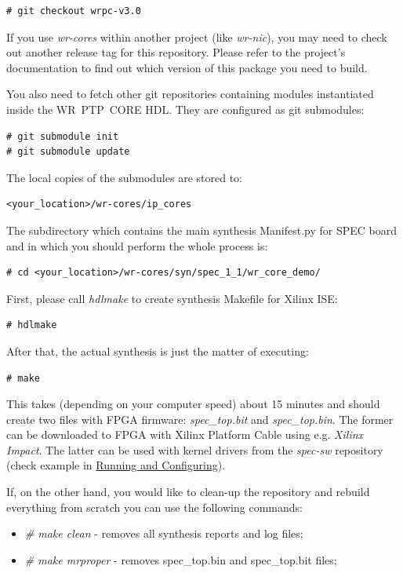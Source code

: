 \documentclass[a4paper, 12pt]{article}
\newcommand{\link}[1]{\hyperref[#1]{#1}}
\newcommand{\codeHook}[1]{\mbox{\ttfamily\MakeTextUppercase{#1}}}
\begin{document}
\begin{lstlisting}
# git checkout wrpc-v3.0
\end{lstlisting}

If you use \textit{wr-cores} within another project (like \textit{wr-nic}), you may need
to check out another release tag for this repository. Please refer to the
project's documentation to find out which version of this package you need to
build.

You also need to fetch other git repositories containing modules instantiated
inside the \codeHook{wr ptp core} HDL. They are configured as git submodules:
\begin{lstlisting}
# git submodule init
# git submodule update
\end{lstlisting}

The local copies of the submodules are stored to:

\begin{lstlisting}
<your_location>/wr-cores/ip_cores
\end{lstlisting}

\vspace{1em}
The subdirectory which contains the main synthesis Manifest.py for \codeHook{spec} board
and in which you should perform the whole process is:

\begin{lstlisting}
# cd <your_location>/wr-cores/syn/spec_1_1/wr_core_demo/
\end{lstlisting}

First, please call \textit{hdlmake} to create synthesis Makefile for Xilinx
ISE:

\begin{lstlisting}
# hdlmake
\end{lstlisting}

After that, the actual synthesis is just the matter of executing:

\begin{lstlisting}
# make
\end{lstlisting}

This takes (depending on your computer speed) about 15 minutes and should create
two files with FPGA firmware: \textit{spec\_top.bit} and \textit{spec\_top.bin}. The
former can be downloaded to FPGA with Xilinx Platform Cable using e.g.
\textit{Xilinx Impact}. The latter can be used with kernel drivers from the
\textit{spec-sw} repository (check example in \link{Running and Configuring}).

\vspace{1em}
If, on the other hand, you would like to clean-up the repository and rebuild
everything from scratch you can use the following commands:
\begin{itemize}
\item \textit{\# make clean} - removes all synthesis reports and log files;
\item \textit{\# make mrproper} - removes spec\_top.bin and spec\_top.bit files;
\end{itemize}
\end{document}
